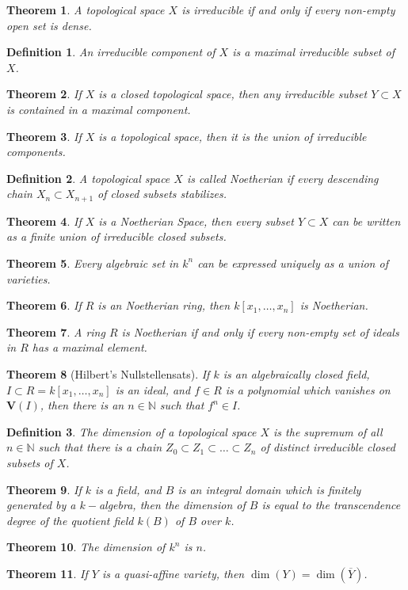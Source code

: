 \documentclass[oneside]{book}
\theoremstyle{mystyle}
\newtheorem{theorem}{Theorem}[section]
\newtheorem{definition}{Definition}[section]
\begin{document}
\begin{theorem}
A topological space $X$ is irreducible if and only if every non-empty open set is dense.
\end{theorem}
\begin{definition}
An irreducible component of $X$ is a maximal irreducible subset of $X$.
\end{definition}
\begin{theorem}
If $X$ is a closed topological space, then any irreducible subset $Y\subset X$ is contained in a maximal component.
\end{theorem}
\begin{theorem}
If $X$ is a topological space, then it is the union of irreducible components.
\end{theorem}
\begin{definition}
A topological space $X$ is called Noetherian if every descending chain $X_n \subset X_{n+1}$ of closed subsets stabilizes.
\end{definition}
\begin{theorem}
If $X$ is a Noetherian Space, then every subset $Y\subset X$ can be written as a finite union of irreducible closed subsets.
\end{theorem}
\begin{theorem}
Every algebraic set in $k^n$ can be expressed uniquely as a union of varieties.
\end{theorem}
\begin{theorem}
If $R$ is an Noetherian ring, then $k[x_1,\hdots ,x_n]$ is Noetherian.
\end{theorem}
\begin{theorem}
A ring $R$ is Noetherian if and only if every non-empty set of ideals in $R$ has a maximal element.
\end{theorem}
\begin{theorem}[Hilbert's Nullstellensats]
If $k$ is an algebraically closed field, $I\subset R = k[x_1,\hdots ,x_n]$ is an ideal, and $f\in R$ is a polynomial which vanishes on $\mathbf{V}(I)$, then there is an $n\in \mathbb{N}$ such that $f^n \in I$.
\end{theorem}
\begin{definition}
The dimension of a topological space $X$ is the supremum of all $n\in \mathbb{N}$ such that there is a chain $Z_0\subset Z_1\subset \hdots \subset Z_n$ of distinct irreducible closed subsets of $X$.
\end{definition}
\begin{theorem}
If $k$ is a field, and $B$ is an integral domain which is finitely generated by a $k-$algebra, then the dimension of $B$ is equal to the transcendence degree of the quotient field $k(B)$ of $B$ over $k$.
\end{theorem}
\begin{theorem}
The dimension of $k^n$ is $n$.
\end{theorem}
\begin{theorem}
If $Y$ is a quasi-affine variety, then $\dim(Y) = \dim(\overline{Y})$.
\end{theorem}
\end{document}
